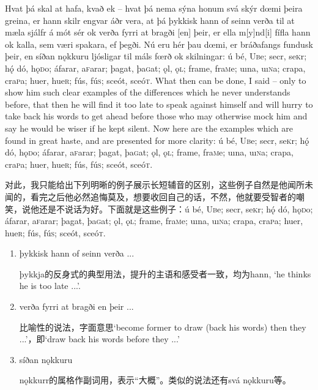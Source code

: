 \begin{paracol}{2}
    Hvat þá skal at hafa, kvað ek – hvat þá nema sýna honum svá skýr dœmi þeira greina, er hann skilr engvar áðr vera, at þá þykkisk hann of seinn verða til at mæla sjálfr á mót sér ok verða fyrri at bragði [en] þeir, er ella m[y]nd[i] fífla hann ok kalla, sem væri spakara, ef þegði. Nú eru hér þau dœmi, er bráðafangs fundusk þeir, en síðan nǫkkuru ljósligar til máls fœrð ok skilningar: ú bé, U\textsc{b}e; secr, se\textsc{k}r; hǫ́ dó, hǫ\textsc{d}o; áfarar, a\textsc{f}arar; þagat, þa\textsc{g}at; ǫl, ǫ\textsc{l}; frame, fra\textsc{m}e; uına, uı\textsc{n}a; crapa, cra\textsc{p}a; huer, hue\textsc{r}; fús, fú\textsc{s}; sceót, sceó\textsc{t}.
    \switchcolumn
    What then can be done, I said – only to show him such clear examples of the differences which he never understands before, that then he will find it too late to speak against himself and will hurry to take back his words to get ahead before those who may otherwise mock him and say he would be wiser if he kept silent. Now here are the examples which are found in great haste, and are presented for more clarity: ú bé, U\textsc{b}e; secr, se\textsc{k}r; hǫ́ dó, hǫ\textsc{d}o; áfarar, a\textsc{f}arar; þagat, þa\textsc{g}at; ǫl, ǫ\textsc{l}; frame, fra\textsc{m}e; uına, uı\textsc{n}a; crapa, cra\textsc{p}a; huer, hue\textsc{r}; fús, fú\textsc{s}; sceót, sceó\textsc{t}.
\end{paracol}
\begin{translation*}{}
    对此，我只能给出下列明晰的例子展示长短辅音的区别，这些例子自然是他闻所未闻的，看完之后他必然追悔莫及，想要收回自己的话，不然，他就要受智者的嘲笑，说他还是不说话为好。下面就是这些例子：ú bé, U\textsc{b}e; secr, se\textsc{k}r; hǫ́ dó, hǫ\textsc{d}o; áfarar, a\textsc{f}arar; þagat, þa\textsc{g}at; ǫl, ǫ\textsc{l}; frame, fra\textsc{m}e; uına, uı\textsc{n}a; crapa, cra\textsc{p}a; huer, hue\textsc{r}; fús, fú\textsc{s}; sceót, sceó\textsc{t}.
\end{translation*}
\begin{grammar*}{}
    \begin{enumerate}[leftmargin=*]
        \item þykkisk hann of seinn verða ...

              þykkja的反身式的典型用法，提升的主语和感受者一致，均为hann, `he thinks he is too late ...'.

        \item verða fyrri at bragði en þeir ...

              比喻性的说法，字面意思`become former to draw (back his words) then they ...'，即`draw back his words before they ...'

        \item síðan nǫkkuru

              nǫkkurr的属格作副词用，表示“大概”。类似的说法还有svá nǫkkuru等。
    \end{enumerate}
\end{grammar*}
